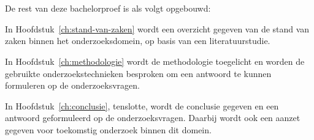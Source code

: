 \section{}%
\label{sec:opzet-bachelorproef}


De rest van deze bachelorproef is als volgt opgebouwd:

In Hoofdstuk~\ref{ch:stand-van-zaken} wordt een overzicht gegeven van de stand van zaken binnen het onderzoeksdomein, op basis van een literatuurstudie.

In Hoofdstuk~\ref{ch:methodologie} wordt de methodologie toegelicht en worden de gebruikte onderzoekstechnieken besproken om een antwoord te kunnen formuleren op de onderzoeksvragen.


In Hoofdstuk~\ref{ch:conclusie}, tenslotte, wordt de conclusie gegeven en een antwoord geformuleerd op de onderzoeksvragen. Daarbij wordt ook een aanzet gegeven voor toekomstig onderzoek binnen dit domein.